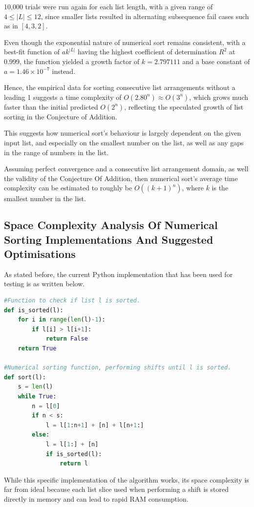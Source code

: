 \documentclass[12pt]{article}
\begin{document}
10,000 trials were run again for each list length, with a given range of $4 \leq |L| \leq 12$, since smaller lists resulted in alternating subsequence fail cases such as in $[4,3,2]$.

Even though the exponential nature of numerical sort remains consistent, with a best-fit function of $ak^{|L|}$ having the highest coefficient of determination $R^2$ at 0.999, the function yielded a growth factor of $k=2.797111$ and a base constant of $a=1.46 \times 10^{-7}$ instead.

Hence, the empirical data for sorting consecutive list arrangements without a leading 1 suggests a time complexity of $O(2.80^n) \approx O(3^n)$, which grows much faster than the initial predicted $O(2^n)$, reflecting the speculated growth of list sorting in the Conjecture of Addition.

This suggests how numerical sort's behaviour is largely dependent on the given input list, and especially on the smallest number on the list, as well as any gaps in the range of numbers in the list.

Assuming perfect convergence and a consecutive list arrangement domain, as well the validity of the Conjecture Of Addition, then numerical sort's average time complexity can be estimated to roughly be $O((k+1)^n)$, where $k$ is the smallest number in the list.

\subsection{Space Complexity Analysis Of Numerical Sorting Implementations And Suggested Optimisations}

As stated before, the current Python implementation that has been used for testing is as written below.

\begin{lstlisting}[language=Python]
#Function to check if list l is sorted.
def is_sorted(l):
    for i in range(len(l)-1):
        if l[i] > l[i+1]:
            return False
    return True

#Numerical sorting function, performing shifts until l is sorted.
def sort(l):
    s = len(l)
    while True:
        n = l[0]
        if n < s:
            l = l[1:n+1] + [n] + l[n+1:]
        else:
            l = l[1:] + [n]
            if is_sorted(l):
                return l
\end{lstlisting}

While this specific implementation of the algorithm works, its space complexity is far from ideal because each list slice used when performing a shift is stored directly in memory and can lead to rapid RAM consumption.
\end{document}
